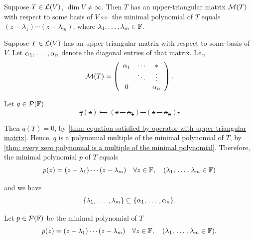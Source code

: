 \setcounter{thm}{43}
\begin{thm}
  \label{thm: necessary and sufficient condition to have an upper-triangular-matrix}
  Suppose $T\in \mathcal{L}(V)$, $\dim V \neq \infty$.
  Then $T$ has an upper-triangular matrix $\mathcal{M}(T)$ with respect to some basis of $V \iff$ the minimal polynomial of $T$ equals $(z-\lambda_1) \cdots (z-\lambda_m)$, where $\lambda_1, \dots, \lambda_m \in \mathbb{F}.$
\end{thm}
\begin{prf}
  \Rightarrowdirection Suppose $T \in \mathcal{L}(V)$ has an upper-triangular matrix with respect to some basis of $V$. Let $\alpha_1, {\, \ldots \,\,}, \alpha_n$ denote the diagonal entries of that matrix. I.e.,
  \begin{equation}
  \mmatrix(T) =
  \left( {\begin{array}{ccc}
      \alpha_1 &     \cdots     &  \mathlarger{*} \\
      &  \ddots & \vdots   \\
      0      &         & \alpha_n
  \end{array} } \right).
  \end{equation}

  Let $q\in \mathcal{P}(\mathbb{F})$ \st
  \begin{equation}
    q(z) := (z-\alpha_1) \cdots (z-\alpha_n).
  \end{equation}

  Then $q(T) = 0$, by \ref{thm: equation satisfied by operator with upper triangular matrix}. Hence, $q$ is a polynomial multiple of the minimal polynomial of $T$, by \ref{thm: every zero polynomial is a multiple of the minimal polynomial}.
  Therefore, the minimal polynomial $p$ of $T$ equals
  \begin{equation}
    p(z) = (z-\lambda_1) \cdots (z-\lambda_m) \quad \forall z \in \mathbb{F}, \quad (\lambda_1, {\, \ldots \,\,}, \lambda_m \in \mathbb{F})
  \end{equation}

  and we have
  \begin{equation}
    \{ \lambda_1 , {\, \ldots \,\,}, \lambda_m \} \subseteq \{\alpha_1, {\, \ldots \,\,}, \alpha_n \}.
  \end{equation}

  \Leftarrowdirection Let $p \in \mathcal{P}(\mathbb{F})$ be the minimal polynomial of $T$ \st
  \begin{equation}
    \label{eq: definition of the minimal polynomial}
    p(z) = (z-\lambda_1) \cdots (z-\lambda_m) \quad \forall z \in \mathbb{F}, \quad (\lambda_1, {\, \ldots \,\,}, \lambda_m \in \mathbb{F}).
  \end{equation}


\end{prf}
